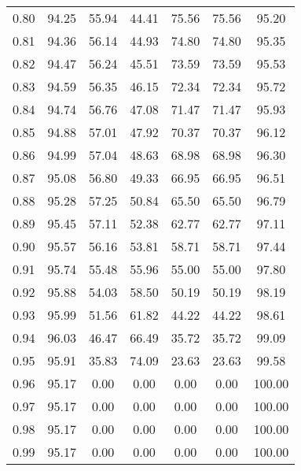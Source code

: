 \begin{tabular}{|c|c|c|c|c|c|c|}
      0.80 &     94.25 &     55.94 &      44.41 &   75.56 &      75.56 &         95.20 \\
      0.81 &     94.36 &     56.14 &      44.93 &   74.80 &      74.80 &         95.35 \\
      0.82 &     94.47 &     56.24 &      45.51 &   73.59 &      73.59 &         95.53 \\
      0.83 &     94.59 &     56.35 &      46.15 &   72.34 &      72.34 &         95.72 \\
      0.84 &     94.74 &     56.76 &      47.08 &   71.47 &      71.47 &         95.93 \\
      0.85 &     94.88 &     57.01 &      47.92 &   70.37 &      70.37 &         96.12 \\
      0.86 &     94.99 &     57.04 &      48.63 &   68.98 &      68.98 &         96.30 \\
      0.87 &     95.08 &     56.80 &      49.33 &   66.95 &      66.95 &         96.51 \\
      0.88 &     95.28 &     57.25 &      50.84 &   65.50 &      65.50 &         96.79 \\
      0.89 &     95.45 &     57.11 &      52.38 &   62.77 &      62.77 &         97.11 \\
      0.90 &     95.57 &     56.16 &      53.81 &   58.71 &      58.71 &         97.44 \\
      0.91 &     95.74 &     55.48 &      55.96 &   55.00 &      55.00 &         97.80 \\
      0.92 &     95.88 &     54.03 &      58.50 &   50.19 &      50.19 &         98.19 \\
      0.93 &     95.99 &     51.56 &      61.82 &   44.22 &      44.22 &         98.61 \\
      0.94 &     96.03 &     46.47 &      66.49 &   35.72 &      35.72 &         99.09 \\
      0.95 &     95.91 &     35.83 &      74.09 &   23.63 &      23.63 &         99.58 \\
      0.96 &     95.17 &      0.00 &       0.00 &    0.00 &       0.00 &        100.00 \\
      0.97 &     95.17 &      0.00 &       0.00 &    0.00 &       0.00 &        100.00 \\
      0.98 &     95.17 &      0.00 &       0.00 &    0.00 &       0.00 &        100.00 \\
      0.99 &     95.17 &      0.00 &       0.00 &    0.00 &       0.00 &        100.00 \\
\bottomrule
\end{tabular}
